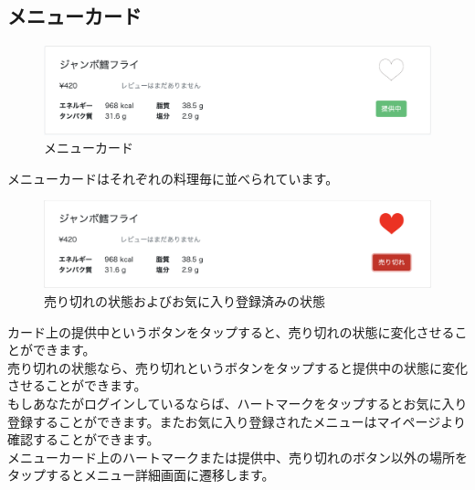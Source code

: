 \documentclass[a4paper]{jsarticle}
\begin{document}
\subsection{メニューカード}
\begin{figure}[htbp]
\centering
	\caption{メニューカード}
	\includegraphics[scale = 0.2]{image/menucard.png}
\end{figure}

メニューカードはそれぞれの料理毎に並べられています。\\
\begin{figure}[htbp]
\centering
	\caption{売り切れの状態およびお気に入り登録済みの状態}
	\includegraphics[scale = 0.2]{image/menucard2.png}
\end{figure}
カード上の提供中というボタンをタップすると、売り切れの状態に変化させることができます。\\
売り切れの状態なら、売り切れというボタンをタップすると提供中の状態に変化させることができます。\\
もしあなたがログインしているならば、ハートマークをタップするとお気に入り登録することができます。またお気に入り登録されたメニューはマイページより確認することができます。\\
メニューカード上のハートマークまたは提供中、売り切れのボタン以外の場所をタップするとメニュー詳細画面に遷移します。
\newpage
\end{document}
